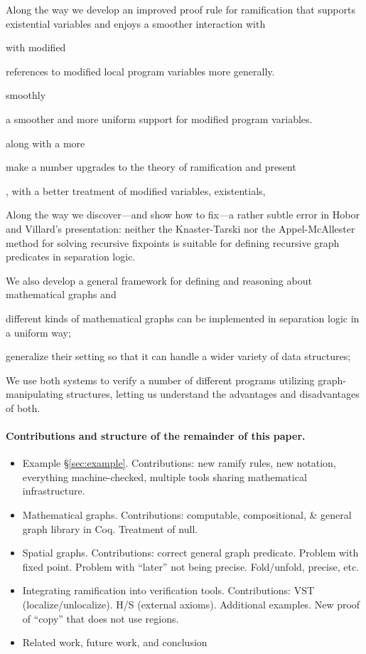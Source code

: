 \documentclass[pldi]{sigplanconf-pldi15}
\begin{document}
Along the way we develop an improved proof rule for ramification that supports existential variables and enjoys a smoother interaction with


with modified

 references to modified local program variables more generally.

 smoothly



a smoother and more uniform support for modified program variables.

along with a more

make a number upgrades to the theory of ramification and present

, with a better treatment of modified variables, existentials,

Along the way we discover---and show how to fix---a rather subtle error in Hobor and Villard's presentation: neither the
Knaster-Tarski \cite{tarski:fixpoint} nor the Appel-McAllester \cite{appel:fixpoint} method for solving recursive fixpoints is suitable for defining
recursive graph predicates in separation logic.

  We also develop a general framework for defining and reasoning about mathematical
graphs and

different kinds of mathematical
graphs can be implemented in separation logic in a uniform way;

generalize their setting
so that it can handle a wider variety of data structures;

We use both systems to verify a number of different programs utilizing graph-manipulating structures,
letting us understand the advantages and disadvantages of both.

\paragraph{Contributions and structure of the remainder of this paper.}
\begin{itemize}
\item Example \S\ref{sec:example}.  Contributions: new ramify rules, new notation, everything machine-checked, multiple tools sharing mathematical infrastructure.
\item Mathematical graphs.  Contributions: computable, compositional, \& general graph library in Coq.  Treatment of null.
\item Spatial graphs.  Contributions: correct general graph predicate.  Problem with fixed point.  Problem with ``later'' not being precise.  Fold/unfold, precise, etc.
\item Integrating ramification into verification tools.  Contributions: VST (localize/unlocalize). H/S (external axioms).  Additional examples.  New proof of ``copy'' that does not use regions.
\item Related work, future work, and conclusion
\end{itemize}
\end{document}

